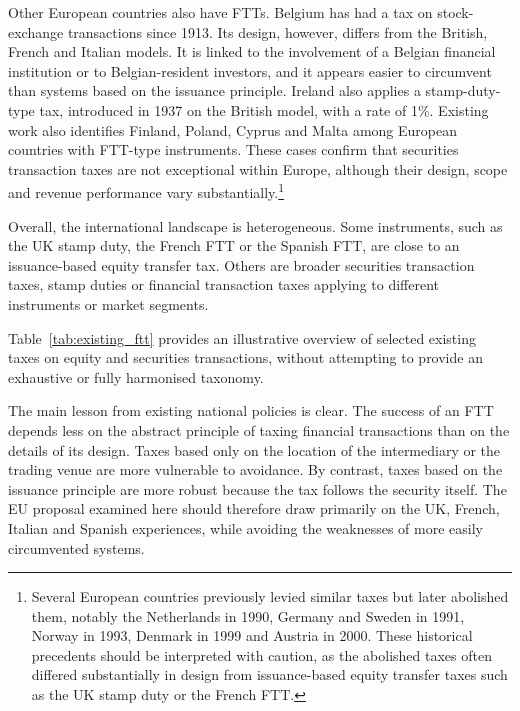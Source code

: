 \documentclass[../../main]{subfiles}
\begin{document}
Other European countries also have FTTs. Belgium has had a tax on stock-exchange transactions since 1913. Its design, however, differs from the British, French and Italian models. It is linked to the involvement of a Belgian financial institution or to Belgian-resident investors, and it appears easier to circumvent than systems based on the issuance principle. Ireland also applies a stamp-duty-type tax, introduced in 1937 on the British model, with a rate of 1\%. Existing work also identifies Finland, Poland, Cyprus and Malta among European countries with FTT-type instruments. These cases confirm that securities transaction taxes are not exceptional within Europe, although their design, scope and revenue performance vary substantially.\footnote{Several European countries previously levied similar taxes but later abolished them, notably the Netherlands in 1990, Germany and Sweden in 1991, Norway in 1993, Denmark in 1999 and Austria in 2000. These historical precedents should be interpreted with caution, as the abolished taxes often differed substantially in design from issuance-based equity transfer taxes such as the UK stamp duty or the French FTT.}

Overall, the international landscape is heterogeneous. Some instruments, such as the UK stamp duty, the French FTT or the Spanish FTT, are close to an issuance-based equity transfer tax. Others are broader securities transaction taxes, stamp duties or financial transaction taxes applying to different instruments or market segments. 

Table~\ref{tab:existing_ftt} provides an illustrative overview of selected existing taxes on equity and securities transactions, without attempting to provide an exhaustive or fully harmonised taxonomy.

The main lesson from existing national policies is clear. The success of an FTT depends less on the abstract principle of taxing financial transactions than on the details of its design. Taxes based only on the location of the intermediary or the trading venue are more vulnerable to avoidance. By contrast, taxes based on the issuance principle are more robust because the tax follows the security itself. The EU proposal examined here should therefore draw primarily on the UK, French, Italian and Spanish experiences, while avoiding the weaknesses of more easily circumvented systems.
\end{document}
